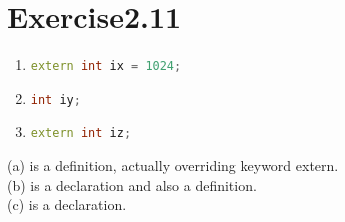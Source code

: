 \documentclass{article}
\begin{document}
    
\section*{Exercise2.11}

\begin{enumerate}[label=(\alph*)]
    \item \lstinline[language=C++]|extern int ix = 1024;|
    \item \lstinline[language=C++]|int iy;|
    \item \lstinline[language=C++]|extern int iz;|
\end{enumerate}

\begin{flushleft}
(a) is a definition, actually overriding keyword extern. \\
(b) is a declaration and also a definition. \\
(c) is a declaration.
\end{flushleft}
\end{document}
